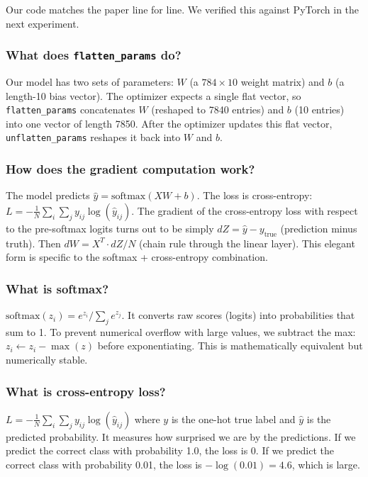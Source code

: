 \documentclass[11pt, letterpaper]{article}
\begin{document}
Our code matches the paper line for line. We verified this against PyTorch in the next experiment.

\begin{deepdive}
\subsubsection{What does \texttt{flatten\_params} do?}
Our model has two sets of parameters: $W$ (a $784 \times 10$ weight matrix) and $b$ (a length-10 bias vector). The optimizer expects a single flat vector, so \texttt{flatten\_params} concatenates $W$ (reshaped to 7840 entries) and $b$ (10 entries) into one vector of length 7850. After the optimizer updates this flat vector, \texttt{unflatten\_params} reshapes it back into $W$ and $b$.

\subsubsection{How does the gradient computation work?}
The model predicts $\hat{y} = \text{softmax}(XW + b)$. The loss is cross-entropy: $L = -\frac{1}{N}\sum_{i}\sum_{j} y_{ij} \log(\hat{y}_{ij})$. The gradient of the cross-entropy loss with respect to the pre-softmax logits turns out to be simply $dZ = \hat{y} - y_{\text{true}}$ (prediction minus truth). Then $dW = X^T \cdot dZ / N$ (chain rule through the linear layer). This elegant form is specific to the softmax + cross-entropy combination.

\subsubsection{What is softmax?}
$\text{softmax}(z_i) = e^{z_i} / \sum_j e^{z_j}$. It converts raw scores (logits) into probabilities that sum to 1. To prevent numerical overflow with large values, we subtract the max: $z_i \leftarrow z_i - \max(z)$ before exponentiating. This is mathematically equivalent but numerically stable.

\subsubsection{What is cross-entropy loss?}
$L = -\frac{1}{N}\sum_{i}\sum_{j} y_{ij}\log(\hat{y}_{ij})$ where $y$ is the one-hot true label and $\hat{y}$ is the predicted probability. It measures how surprised we are by the predictions. If we predict the correct class with probability 1.0, the loss is 0. If we predict the correct class with probability 0.01, the loss is $-\log(0.01) = 4.6$, which is large.
\end{deepdive}
\end{document}
